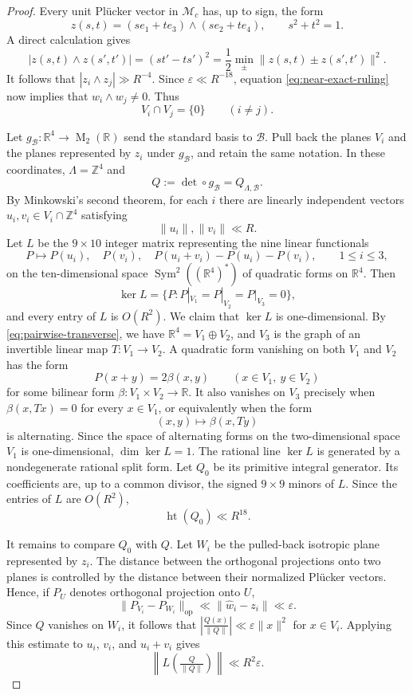 \documentclass[reqno,11pt]{amsart}
\theoremstyle{definition}
\theoremstyle{remark}
\numberwithin{equation}{section}
\newcommand{\M}{\operatorname{M}}
\begin{document}
\begin{proof}
Every unit Pl\"ucker vector in $\mathcal M_c$ has, up to sign, the form
$$
z(s,t)
=
(se_1+te_3)\wedge(se_2+te_4),
\qquad
s^2+t^2=1.
$$
A direct calculation gives
$$
|z(s,t)\wedge z(s',t')|
=
(st'-ts')^2
=
\frac12\min_{\pm}\|z(s,t)\pm z(s',t')\|^2.
$$
It follows that $|z_i\wedge z_j|\gg R^{-4}$. Since
$\varepsilon\ll R^{-18}$, equation \eqref{eq:near-exact-ruling} now implies
that $w_i\wedge w_j\ne0$. Thus
\begin{equation}\label{eq:pairwise-transverse}
V_i\cap V_j=\{0\}
\qquad
(i\ne j).
\end{equation}

Let $g_{\mathcal B}:\mathbb R^4\to\M_2(\mathbb R)$ send the standard basis
to $\mathcal B$. Pull back the planes $V_i$ and the planes represented by
$z_i$ under $g_{\mathcal B}$, and retain the same notation.  In these
coordinates, $\Lambda=\mathbb Z^4$ and
$$
Q:=\det\circ g_{\mathcal B}=Q_{\Lambda,\mathcal B}.
$$
By Minkowski's second theorem, for each $i$ there are linearly independent
vectors $u_i,v_i\in V_i\cap\mathbb Z^4$ satisfying
$$
\|u_i\|,\|v_i\|\ll R.
$$
Let $L$ be the $9\times10$ integer matrix representing the nine linear
functionals
$$
P\mapsto P(u_i),\quad
P(v_i),\quad
P(u_i+v_i)-P(u_i)-P(v_i),
\qquad
1\le i\le3,
$$
on the ten-dimensional space $\operatorname{Sym}^2((\mathbb R^4)^*)$ of quadratic forms on $\mathbb R^4$. Then
$$
\ker L
=
\{P:P|_{V_1}=P|_{V_2}=P|_{V_3}=0\},
$$
and every entry of $L$ is $O(R^2)$. We claim that $\ker L$ is one-dimensional. By
\eqref{eq:pairwise-transverse}, we have
$\mathbb R^4=V_1\oplus V_2$, and $V_3$ is the graph of an invertible linear
map $T:V_1\to V_2$. A quadratic form vanishing on both $V_1$ and $V_2$ has
the form
$$
P(x+y)=2\beta(x,y)
\qquad
(x\in V_1,\ y\in V_2)
$$
for some bilinear form $\beta:V_1\times V_2\to\mathbb R$. It also vanishes
on $V_3$ precisely when $\beta(x,Tx)=0$ for every $x\in V_1$, or
equivalently when the form
$$
(x,y)\mapsto\beta(x,Ty)
$$
is alternating. Since the space of alternating forms on the
two-dimensional space $V_1$ is one-dimensional, $\dim\ker L=1$.
The rational line $\ker L$ is generated by a nondegenerate rational
split form. Let $Q_0$ be its primitive integral generator.
 Its
coefficients are, up to a common divisor, the signed $9\times9$ minors of
$L$. Since the entries of $L$ are $O(R^2)$,
\begin{equation}\label{eq:Q0-height}
\operatorname{ht}(Q_0)\ll R^{18}.
\end{equation}

It remains to compare $Q_0$ with $Q$. Let $W_i$ be the pulled-back
isotropic plane represented by $z_i$. The distance between the orthogonal
projections onto two planes is controlled by the distance between their
normalized Pl\"ucker vectors. Hence, if $P_U$ denotes orthogonal projection
onto $U$,
$$
\|P_{V_i}-P_{W_i}\|_{\operatorname{op}}
\ll
\|\widehat w_i-z_i\|
\ll\varepsilon.
$$
Since $Q$ vanishes on $W_i$, it follows that
$
\left|\frac{Q(x)}{\|Q\|}\right|
\ll
\varepsilon\|x\|^2$ for $x\in V_i$.
Applying this estimate to $u_i$, $v_i$, and $u_i+v_i$ gives
\begin{equation}\label{eq:LQ-small}
\left\|
L\left(\tfrac{Q}{\|Q\|}\right)
\right\|
\ll
R^2\varepsilon.
\end{equation}


\end{proof}
\end{document}
